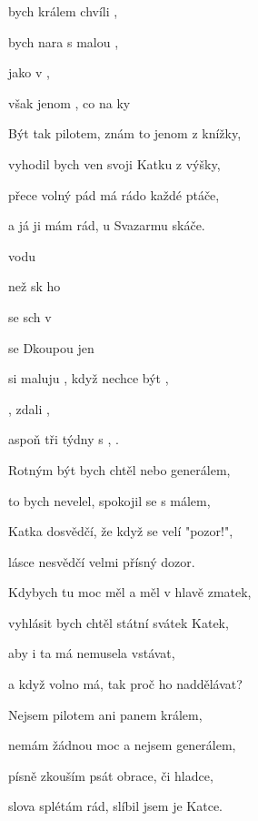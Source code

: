 

\zs
{} bych králem   chvíli , 

 bych nara  s malou , 

 jako  v  , 

 však jenom , co  na ky   
\ks

\zs
Být tak pilotem, znám to jenom z knížky, 

vyhodil bych ven svoji Katku z výšky, 

přece volný pád má rádo každé ptáče, 

a já ji mám rád, u Svazarmu skáče. 
\ks

\zr
{} vodu  

 než sk ho   

 se sch v  

  se Dkoupou jen   

 si maluju ,  když nechce být , 

, zdali  , 

 aspoň tři týdny s , .
\kr

\zs
Rotným být bych chtěl nebo generálem, 

to bych nevelel, spokojil se s málem, 

Katka dosvědčí, že když se velí "pozor!", 

lásce nesvědčí velmi přísný dozor. 
\ks

\zs
Kdybych tu moc měl a měl v hlavě zmatek, 

vyhlásit bych chtěl státní svátek Katek, 

aby i ta má nemusela vstávat, 

a když volno má, tak proč ho naddělávat? 
\ks

\zr     \kr

\zs
Nejsem pilotem ani panem králem, 

nemám žádnou moc a nejsem generálem, 

písně zkouším psát obrace, či hladce, 

slova splétám rád, slíbil jsem je Katce.
\ks

\kp
